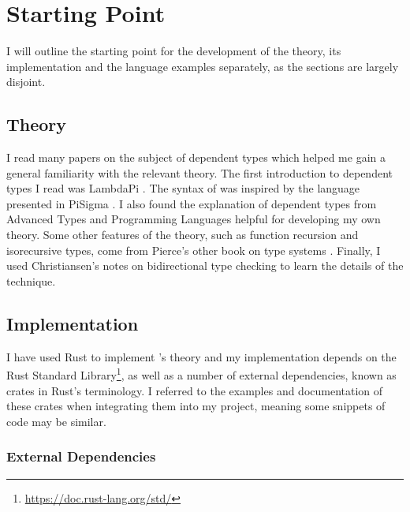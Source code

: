 \documentclass[12pt,a4paper,twoside]{report}
\begin{document}
\section{Starting Point}

I will outline the starting point for the development of the theory, its implementation and the language examples separately, as the sections are largely disjoint.

\subsection{Theory}

I read many papers on the subject of dependent types which helped me gain a general familiarity with the relevant theory.
The first introduction to dependent types I read was LambdaPi \cite{loeh10}.
The syntax of \pimu{} was inspired by the language presented in PiSigma \cite{thorsten10}.
I also found the explanation of dependent types from Advanced Types and Programming Languages \cite{aspinall04} helpful for developing my own theory.
Some other features of the theory, such as function recursion and isorecursive types, come from Pierce's other book on type systems \cite{pierce02}.
Finally, I used Christiansen's notes on bidirectional type checking \cite{christiansen13} to learn the details of the technique.

\subsection{Implementation}

I have used Rust to implement \pimu{}'s theory and my implementation depends on the Rust Standard Library\footnote{\url{https://doc.rust-lang.org/std/}}, as well as a number of external dependencies, known as crates in Rust's terminology.
I referred to the examples and documentation of these crates when integrating them into my project, meaning some snippets of code may be similar.

\subsubsection{External Dependencies}
\end{document}
